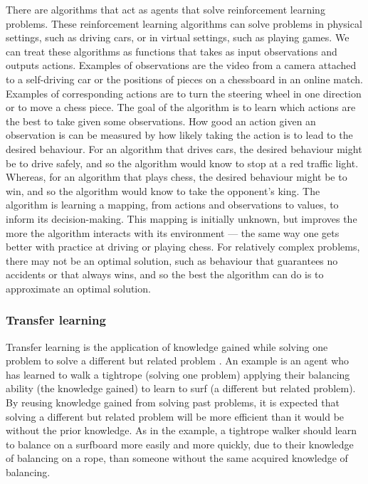\documentclass[12pt,a4paper]{article}
\begin{document}
There are algorithms that act as agents that solve reinforcement learning problems. These reinforcement learning algorithms can solve problems in physical settings, such as driving cars, or in virtual settings, such as playing games. We can treat these algorithms as functions that takes as input observations and outputs actions. Examples of observations are the video from a camera attached to a self-driving car or the positions of pieces on a chessboard in an online match. Examples of corresponding actions are to turn the steering wheel in one direction or to move a chess piece. The goal of the algorithm is to learn which actions are the best to take given some observations. How good an action given an observation is can be measured by how likely taking the action is to lead to the desired behaviour. For an algorithm that drives cars, the desired behaviour might be to drive safely, and so the algorithm would know to stop at a red traffic light. Whereas, for an algorithm that plays chess, the desired behaviour might be to win, and so the algorithm would know to take the opponent's king. The algorithm is learning a mapping, from actions and observations to values, to inform its decision-making. This mapping is initially unknown, but improves the more the algorithm interacts with its environment --- the same way one gets better with practice at driving or playing chess. For relatively complex problems, there may not be an optimal solution, such as behaviour that guarantees no accidents or that always wins, and so the best the algorithm can do is to approximate an optimal solution. 

\subsubsection{Transfer learning}
Transfer learning is the application of knowledge gained while solving one problem to solve a different but related problem \cite{2010}. An example is an agent who has learned to walk a tightrope (solving one problem) applying their balancing ability (the knowledge gained) to learn to surf (a different but related problem). By reusing knowledge gained from solving past problems, it is expected that solving a different but related problem will be more efficient than it would be without the prior knowledge. As in the example, a tightrope walker should learn to balance on a surfboard more easily and more quickly, due to their knowledge of balancing on a rope, than someone without the same acquired knowledge of balancing. 
\end{document}
